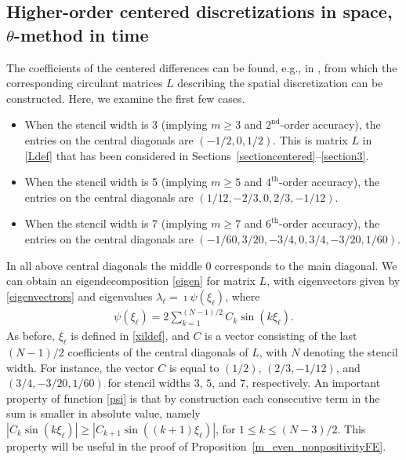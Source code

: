 \documentclass[a4paper]{article}
\begin{document}
\subsection{Higher-order centered discretizations in space, \texorpdfstring{$\theta$}{}-method in time}\label{highercentered}
The coefficients of the centered differences can be found, e.g., in \cite{bengt}, from which the
corresponding circulant matrices $L$ describing the spatial discretization can be constructed.
Here, we examine the first few cases.
\begin{itemize}
\item When the stencil width is 3 (implying  $m\ge 3$ and $2^\text{nd}$-order accuracy), the entries on
the central diagonals are $(-1/2, 0, 1/2)$. This is matrix $L$ in \eqref{Ldef} that has been considered in
Sections~\ref{sectioncentered}--\ref{section3}.
\item When the stencil width is 5 (implying  $m\ge 5$ and $4^\text{th}$-order accuracy), the entries on
the central diagonals are $(1/12, -2/3, 0, 2/3, -1/12)$.
\item When the stencil width is 7 (implying $m\ge 7$ and $6^\text{th}$-order accuracy), the entries on the
central diagonals are $(-1/60, 3/20, -3/4, 0, 3/4, -3/20, 1/60)$.
\end{itemize}
In all above central diagonals the middle $0$ corresponds to the main diagonal.
We can obtain an eigendecomposition \eqref{eigen} for matrix $L$, with eigenvectors given by
\eqref{eigenvectrors} and eigenvalues $\lambda_\ell = \imath \psi(\xi_\ell)$, where
\begin{align}\label{psi}
	\psi(\xi_\ell) = 2 \sum_{k=1}^{(N-1)/2} C_k \sin(k\xi_\ell).
\end{align}
As before, $\xi_\ell$ is defined in \eqref{xildef}, and $C$ is a vector consisting of the last $(N-1)/2$
coefficients of the central diagonals of $L$, with $N$ denoting the stencil width.
For instance, the vector $C$ is equal to $(1/2)$, $(2/3,-1/12)$, and $(3/4,-3/20,1/60)$ for stencil widths
$3$, $5$, and $7$, respectively.
An important property of function \eqref{psi} is that by construction each consecutive term in the sum is smaller in absolute value, namely $|C_k \sin(k\xi_\ell)| \ge |C_{k+1} \sin((k+1)\xi_\ell)|$, for $1 \le k \le (N-3)/2$.
This property will be useful in the proof of Proposition~\ref{m_even_nonpositivityFE}.
\end{document}
